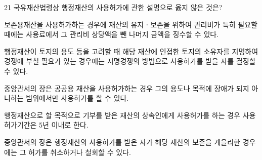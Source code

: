 \begin{question}{21}
국유재산법령상 행정재산의 사용허가에 관한 설명으로 옳지 않은 것은?
\begin{choices}
  \item 보존용재산을 사용허가하는 경우에 재산의 유지ㆍ보존을 위하여 관리비가 특히 필요할 때에는 사용료에서 그 관리비 상당액을 뺀 나머지 금액을 징수할 수 있다.
  \item 행정재산이 토지의 용도 등을 고려할 때 해당 재산에 인접한 토지의 소유자를 지명하여 경쟁에 부칠 필요가 있는 경우에는 지명경쟁의 방법으로 사용허가를 받을 자를 결정할 수 있다.
  \item 중앙관서의 장은 공공용 재산을 사용허가하는 경우 그의 용도나 목적에 장애가 되지 아니하는 범위에서만 사용허가를 할 수 있다.
  \item 행정재산으로 할 목적으로 기부를 받은 재산의 상속인에게 사용허가를 하는 경우 사용허가기간은 5년 이내로 한다.
  \item 중앙관서의 장은 행정재산의 사용허가를 받은 자가 해당 재산의 보존을 게을리한 경우에는 그 허가를 취소하거나 철회할 수 있다.
\end{choices}
\end{question}
